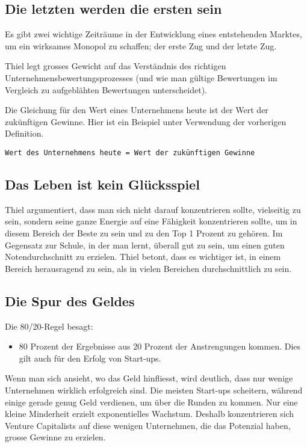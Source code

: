 \documentclass[10pt]{article}
\begin{document}
\subsection{Die letzten werden die ersten sein}

Es gibt zwei wichtige Zeiträume in der Entwicklung eines entstehenden Marktes, um ein wirksames Monopol zu schaffen; der erste Zug und der letzte Zug.

Thiel legt grosses Gewicht auf das Verständnis des richtigen Unternehmensbewertungsprozesses (und wie man gültige Bewertungen im Vergleich zu aufgeblähten Bewertungen unterscheidet).

Die Gleichung für den Wert eines Unternehmens heute ist der Wert der zukünftigen Gewinne. Hier ist ein Beispiel unter Verwendung der vorherigen Definition.

\begin{center}
\texttt{Wert des Unternehmens heute = Wert der zukünftigen Gewinne}
\end{center}

\subsection{Das Leben ist kein Glücksspiel}

Thiel argumentiert, dass man sich nicht darauf konzentrieren sollte, vielseitig zu sein, sondern seine ganze Energie auf eine Fähigkeit konzentrieren sollte, um in diesem Bereich der Beste zu sein und zu den Top 1 Prozent zu gehören. Im Gegensatz zur Schule, in der man lernt, überall gut zu sein, um einen guten Notendurchschnitt zu erzielen. Thiel betont, dass es wichtiger ist, in einem Bereich herausragend zu sein, als in vielen Bereichen durchschnittlich zu sein.

\subsection{Die Spur des Geldes}

Die 80/20-Regel besagt:

\begin{itemize}
\item 80 Prozent der Ergebnisse aus 20 Prozent der Anstrengungen kommen. Dies gilt auch für den Erfolg von Start-ups.
\end{itemize}

Wenn man sich ansieht, wo das Geld hinfliesst, wird deutlich, dass nur wenige Unternehmen wirklich erfolgreich sind. Die meisten Start-ups scheitern, während einige gerade genug Geld verdienen, um über die Runden zu kommen. Nur eine kleine Minderheit erzielt exponentielles Wachstum. Deshalb konzentrieren sich Venture Capitalists auf diese wenigen Unternehmen, die das Potenzial haben, grosse Gewinne zu erzielen.
\end{document}
